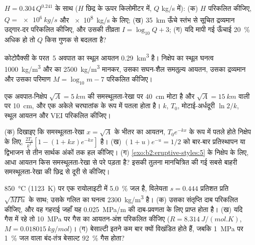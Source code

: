 \begin{exercise}[$\star$]\label{exo:b2:eruptive-styles:3}
$H = 0.304\,Q^{0.241}$ के साथ ($H$ छिद्र के ऊपर किलोमीटर में, $Q$
\unit{kg/s} में): (क) $H$ परिकलित कीजिए, $Q = \qty{e6}{kg/s}$ और \qty{e8}{kg/s} के लिए;
(ख) \qty{35}{km} ऊँचे स्तंभ से सूचित द्रव्यमान उद्गार-दर परिकलित कीजिए, और उसकी
तीव्रता $I = \log_{10}Q + 3$; (ग) यदि मापी गई
ऊँचाई \qty{20}{\percent} अधिक हो तो $Q$ किस गुणक से बदलता है?
\end{exercise}

\begin{exercise}[$\star$]\label{exo:b2:eruptive-styles:4}
कोटोपैक्सी के परत~5 अवपात का स्थूल आयतन \qty{0.29}{km^3} है। निक्षेप का
स्थूल घनत्व \qty{1000}{kg/m^3} और  का \qty{2500}{kg/m^3} मानकर,
उसका सघन-शैल समतुल्य आयतन, उसका द्रव्यमान और उसका परिमाण
$M = \log_{10}m - 7$ परिकलित कीजिए।
\end{exercise}

\begin{exercise}[$\star\star$]\label{exo:b2:eruptive-styles:5}
एक अवपात-निक्षेप $\sqrt A = \qty{5}{km}$ की समस्थूलता-रेखा पर \qty{40}{cm} मोटा है
और $\sqrt A = \qty{15}{km}$ वाली पर \qty{10}{cm}, और एक अकेले
चरघातांक के रूप में पतला होता है। $k$, $T_0$, मोटाई-अर्धदूरी $\ln 2/k$, स्थूल
आयतन और VEI परिकलित कीजिए।
\end{exercise}

\begin{exercise}[$\star\star$]\label{exo:b2:eruptive-styles:6}
(क) दिखाइए कि समस्थूलता-रेखा $x = \sqrt A$ के भीतर का आयतन, $T_0e^{-kx}$ के रूप में पतले होते
निक्षेप के लिए, $\frac{2T_0}{k^2}[1 - (1 + kx)e^{-kx}]$ है। (ख) $(1 + u)e^{-u} =
1/2$ को बार-बार प्रतिस्थापन या द्विभाजन से तीन सार्थक अंकों तक हल कीजिए। (ग)
\cref{exo:b2:eruptive-styles:5} के निक्षेप के लिए, आधा आयतन किस समस्थूलता-रेखा से परे पड़ता है? इसकी तुलना
मानचित्रित की गई सबसे बाहरी समस्थूलता-रेखा की छिद्र से दूरी से कीजिए।
\end{exercise}

\begin{exercise}[$\star\star$]\label{exo:b2:eruptive-styles:7}
\qty{850}{\celsius} (\qty{1123}{K}) पर एक रायोलाइटी  में
\qty{5.0}{\percent} जल है, विलेयता $s = 0.444$ प्रतिशत प्रति
$\sqrt{\unit{MPa}}$ के साथ; उसके गलित का घनत्व \qty{2300}{kg/m^3} है। (क) उसका
संतृप्ति दाब परिकलित कीजिए, और वह गहराई जहाँ यह \qty{0.025}{MPa/m} की
दाब-प्रवणता के लिए प्राप्त होता है। (ख) यदि गैस  में रहे तो
\qty{10}{MPa} पर गैस का आयतन-अंश परिकलित कीजिए ($R = \qty{8.314}{J/(mol.K)}$, $M =
\qty{0.018015}{kg/mol}$)। (ग) बेसाल्टी  इतने कम बार क्यों विखंडित होते हैं,
जबकि \qty{1}{MPa} पर \qty{1}{\percent} जल वाला बंद-तंत्र बेसाल्ट
\qty{92}{\percent} गैस होता?
\end{exercise}

